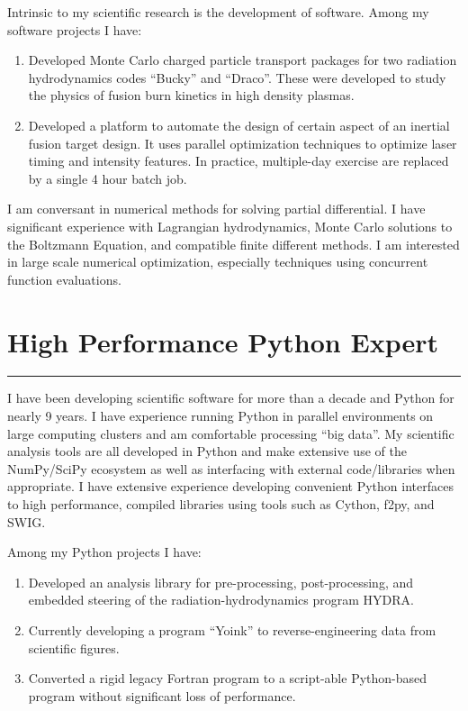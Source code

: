 \documentclass[letterpaper,11pt]{article}
\newcommand{\sectionline}{\vspace{-0.05in}\hrule\vspace{0.05in}}
\begin{document}
Intrinsic to my scientific research is the development of software.  Among my
software projects I have:
\begin{enumerate}
	\item Developed Monte Carlo charged particle transport packages for two
		radiation hydrodynamics codes ``Bucky'' and ``Draco''.  These were
		developed to study the physics of fusion burn kinetics in high density
		plasmas.
	\item Developed a platform to automate the design of certain aspect of an
		inertial fusion target design.  It uses parallel optimization
		techniques to optimize laser timing and intensity features.  In
		practice, multiple-day exercise are replaced by a single 4 hour batch
		job.
\end{enumerate}

I am conversant in numerical methods for solving partial differential.
I have significant experience with Lagrangian hydrodynamics, Monte Carlo
solutions to the Boltzmann Equation, and compatible finite different
methods.  I am interested in large scale numerical
optimization, especially techniques using concurrent function evaluations.


\section*{High Performance Python Expert}
\sectionline
I have been developing scientific software for more than a decade and Python
for nearly 9 years.  I have experience running Python in parallel environments
on large computing clusters and am comfortable processing ``big data''.  My
scientific analysis tools are all developed in Python and make extensive use of
the NumPy/SciPy ecosystem as well as interfacing with external code/libraries
when appropriate.  I have extensive experience developing convenient Python
interfaces to high performance, compiled libraries using tools such as Cython,
f2py, and SWIG.

Among my Python projects I have:
\begin{enumerate}
	\item Developed an analysis library for pre-processing, post-processing,
		and embedded steering of the radiation-hydrodynamics program HYDRA.
	\item Currently developing a program ``Yoink'' to reverse-engineering data
		from scientific figures.
	\item Converted a rigid legacy Fortran program to a script-able
		Python-based program without significant loss of performance.
\end{enumerate}
\end{document}
